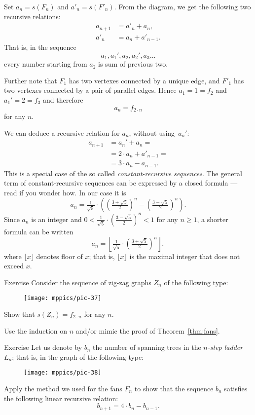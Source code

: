 Set $a_n=s(F_n)$ and $a'_n=s(F'_n)$.
From the diagram, we get the following two recursive relations:
\begin{align*}
a_{n+1}&=a'_n+a_n,
\\
a'_n&=a_n+a'_{n-1}.
\end{align*}
That is, in the sequence 
\[a_1,a_1',a_2,a_2',a_3\dots\]
every number starting from $a_2$ is sum of previous two.

Further note that $F_1$ has two vertexes connected by a unique edge,
and  $F'_1$ has two vertexes connected by a pair of parallel edges.
Hence $a_1=1=f_2$ and $a_1'=2=f_3$ and therefore 
\[a_n=f_{2\cdot n}\]
for any $n$.\qeds

We can deduce a recursive relation for $a_n$, without using~$a_n'$:
\begin{align*}
a_{n+1}&=a_n'+a_n=
\\
&=2\cdot a_n+a'_{n-1}=
\\
&=3\cdot a_n-a_{n-1}.
\end{align*}
This is a special case of the so called \emph{constant-recursive sequences}.
The general term of constant-recursive sequences can be expressed by a closed formula ---
read \cite{jordan} if you wonder how.
In our case it is
\[a_n=\tfrac1{\sqrt{5}}\cdot
\left(
(\tfrac{3+\sqrt{5}}2)^n-(\tfrac{3-\sqrt{5}}2)^n
\right).\]
Since $a_n$ is an integer and $0<\tfrac1{\sqrt{5}}\cdot(\tfrac{3-\sqrt{5}}2)^n<1$ for any $n\ge 1$, a shorter formula can be written
\[a_n
=
\left\lfloor\tfrac1{\sqrt{5}}\cdot(\tfrac{3+\sqrt{5}}2)^n\right\rfloor,\]
where $\lfloor x\rfloor$ denotes floor of $x$; 
that is, $\lfloor x\rfloor$ is the maximal integer that does not exceed $x$.

\begin{thm}{Exercise}
Consider the sequence of zig-zag graphs $Z_n$ of the following type:
\begin{figure}[h!]
\centering
\texttt{[image: mppics/pic-37]}
\end{figure}

Show that $s(Z_n)=f_{2\cdot n}$ for any $n$. 
\end{thm}

 Use the induction on $n$ and/or mimic the proof of Theorem~\ref{thm:fans}.


\begin{thm}{Exercise}
Let us denote by $b_n$ the number of spanning trees in the \label{page:ladder}\emph{$n$-step ladder} $L_n$; that is, in the graph of the following type:

\begin{figure}[h!]
\centering
\texttt{[image: mppics/pic-38]}
\end{figure}

Apply the method we used for the fans $F_n$ to show that the sequence $b_n$ satisfies the following linear recursive relation:
\[b_{n+1}=4\cdot b_n-b_{n-1}.\]

\end{thm}


